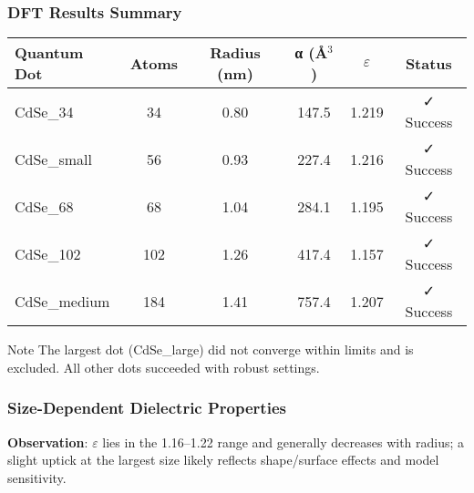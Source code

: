 \documentclass{beamer}
\begin{document}
\begin{frame}
\frametitle{DFT Results Summary}
\begin{table}[h]
\centering
\begin{tabular}{@{}lccccc@{}}
\toprule
\textbf{Quantum Dot} & \textbf{Atoms} & \textbf{Radius (nm)} & \textbf{α (\AA$^3$)} & \textbf{$\varepsilon$} & \textbf{Status} \\
\midrule
CdSe\_34 & 34 & 0.80 & 147.5 & 1.219 & ✓ Success \\
CdSe\_small & 56 & 0.93 & 227.4 & 1.216 & ✓ Success \\
CdSe\_68 & 68 & 1.04 & 284.1 & 1.195 & ✓ Success \\
CdSe\_102 & 102 & 1.26 & 417.4 & 1.157 & ✓ Success \\
CdSe\_medium & 184 & 1.41 & 757.4 & 1.207 & ✓ Success \\
\bottomrule
\end{tabular}
\end{table}

\begin{alertblock}{Note}
The largest dot (CdSe\_large) did not converge within limits and is excluded. All other dots succeeded with robust settings.
\end{alertblock}
\end{frame}

\begin{frame}
\frametitle{Size-Dependent Dielectric Properties}
\begin{center}
\end{center}

\textbf{Observation}: $\varepsilon$ lies in the 1.16--1.22 range and generally decreases with radius; a slight uptick at the largest size likely reflects shape/surface effects and model sensitivity.
\end{frame}
\end{document}
